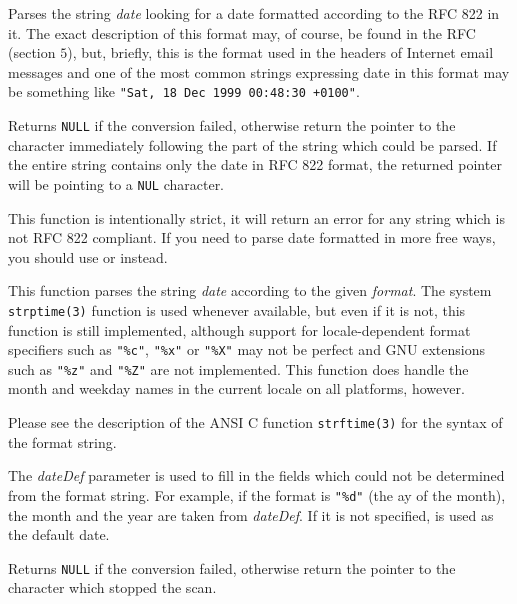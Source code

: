 Parses the string {\it date} looking for a date formatted according to the RFC
822 in it. The exact description of this format may, of course, be found in
the RFC (section $5$), but, briefly, this is the format used in the headers of
Internet email messages and one of the most common strings expressing date in
this format may be something like {\tt "Sat, 18 Dec 1999 00:48:30 +0100"}.

Returns {\tt NULL} if the conversion failed, otherwise return the pointer to
the character immediately following the part of the string which could be
parsed. If the entire string contains only the date in RFC 822 format,
the returned pointer will be pointing to a {\tt NUL} character.

This function is intentionally strict, it will return an error for any string
which is not RFC 822 compliant. If you need to parse date formatted in more
free ways, you should use  or
 instead.


\label{wxdatetimeparseformat}


This function parses the string {\it date} according to the given
{\it format}. The system {\tt strptime(3)} function is used whenever available,
but even if it is not, this function is still implemented, although support
for locale-dependent format specifiers such as {\tt "\%c"}, {\tt "\%x"} or {\tt "\%X"} may
not be perfect and GNU extensions such as {\tt "\%z"} and {\tt "\%Z"} are
not implemented. This function does handle the month and weekday
names in the current locale on all platforms, however.

Please see the description of the ANSI C function {\tt strftime(3)} for the syntax
of the format string.

The {\it dateDef} parameter is used to fill in the fields which could not be
determined from the format string. For example, if the format is {\tt "\%d"} (the
ay of the month), the month and the year are taken from {\it dateDef}. If
it is not specified,  is used as the
default date.

Returns {\tt NULL} if the conversion failed, otherwise return the pointer to
the character which stopped the scan.


